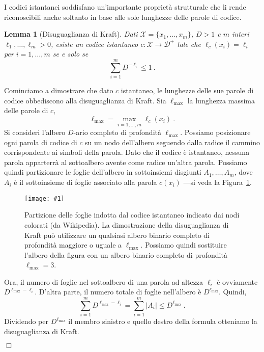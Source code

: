 \documentclass[11pt]{article}
\newtheorem{lemma}[theorem]{Lemma}
\newenvironment{proof}{{\textsc{Dimostrazione.}\ }}{\hfill$\Box$\\[2mm]}
\newcommand{\figscale}[2]{\texttt{[image: \#1]}}
\newcommand{\scD}{\mathcal{D}}
\newcommand{\scX}{\mathcal{X}}
\newcommand{\lmax}{\ell_{\textrm{max}}}
\begin{document}
I codici istantanei soddisfano un'importante proprietà strutturale che li rende riconoscibili anche soltanto in base alle sole lunghezze delle parole di codice.
%
\begin{lemma}[Disuguaglianza di Kraft]
Dati $\scX = \{x_1,\dots,x_m\}$, $D > 1$ e $m$ interi $\ell_1,\dots,\ell_m > 0$, esiste un codice istantaneo $c : \scX \to \scD^+$ tale che $\ell_c(x_i) = \ell_i$ per $i=1,\dots,m$ se e solo se
\[
    \sum_{i=1}^m D^{-\ell_i} \le 1~.
\]
\end{lemma}
%
\begin{proof}
Cominciamo a dimostrare che dato $c$ istantaneo, le lunghezze delle sue parole di codice obbediscono alla disuguaglianza di Kraft. Sia $\lmax$ la lunghezza massima delle parole di $c$,
\[
    \lmax = \max_{i=1,\dots,m} \ell_c(x_i)~.
\]
Si consideri l'albero $D$-ario completo di profondità $\lmax$. Possiamo posizionare ogni parola di codice di $c$ su un nodo dell'albero seguendo dalla radice il cammino corrispondente ai simboli della parola. Dato che il codice è istantaneo, nessuna parola apparterrà al sottoalbero avente come radice un'altra parola. Possiamo quindi partizionare le foglie dell'albero in sottoinsiemi disgiunti $A_1,\dots,A_m$, dove $A_i$ è il sottoinsieme di foglie associato alla parola $c(x_i)$ ---si veda la Figura~\ref{fig:kraft}.
%
\begin{figure}[h]
\begin{center}
\figscale{Images/kraft}{0.4}
\end{center}
\caption{
\label{fig:kraft}
Partizione delle foglie indotta dal codice istantaneo indicato dai nodi colorati (da Wikipedia). La dimostrazione della disuguaglianza di Kraft può utilizzare un qualsiasi albero binario completo di profondità maggiore o uguale a $\lmax$. Possiamo quindi sostituire l'albero della figura con un albero binario completo di profondità $\lmax = 3$.
}
\end{figure}

Ora, il numero di foglie nel sottoalbero di una parola ad altezza $\ell_i$ è ovviamente $D^{\lmax-\ell_i}$. D'altra parte, il numero totale di foglie nell'albero è $D^{\lmax}$. Quindi,
\[
    \sum_{i=1}^m D^{\lmax-\ell_i} = \sum_{i=1}^m |A_i| \le D^{\lmax}~.
\]
Dividendo per $D^{\lmax}$ il membro sinistro e quello destro della formula otteniamo la disuguaglianza di Kraft.


\end{proof}
\end{document}
